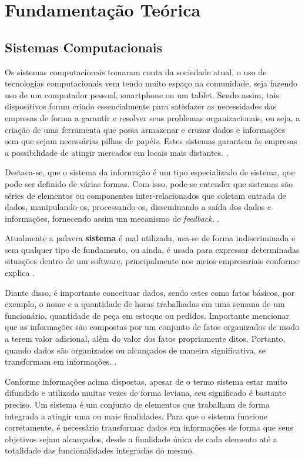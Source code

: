 \chapter{Fundamentação Teórica}

\section{Sistemas Computacionais}

Os sistemas computacionais tomaram conta da sociedade atual, o uso de tecnologias computacionais vem tendo muito espaço na comunidade, seja fazendo uso de um computador pessoal, smartphone ou um tablet. Sendo assim, tais dispositivos foram criado essencialmente para satisfazer as necessidades das empresas de forma a garantir e resolver seus problemas organizacionais, ou seja, a criação de uma ferramenta que possa armazenar e cruzar dados e informações sem que sejam necessárias pilhas de papéis. Estes sistemas garantem às empresas a possibilidade de atingir mercados em locais mais distantes. \cite{MATTIOLI2020}.

Destaca-se, que o sistema da informação é um tipo especializado de sistema, que pode ser definido de várias formas. Com isso, pode-se entender que sistemas são séries de elementos ou componentes inter-relacionados que coletam entrada de dados, manipulando-os, processando-os, disseminando a saída dos dados e informações, fornecendo assim um mecanismo de \textit{feedback}. \cite{STAIR2008}.

Atualmente a palavra \textbf{sistema} é mal utilizada, usa-se de forma indiscriminada e sem qualquer tipo de fundamento, ou ainda, é usada para expressar determinadas situações dentro de um software, principalmente nos meios empresariais conforme explica \cite{ROSSINI2006}.

Diante disso, é importante conceituar dados, sendo estes como fatos básicos, por exemplo, o nome e a quantidade de horas trabalhadas em uma semana de um funcionário, quantidade de peça em estoque ou pedidos. Importante mencionar que as informações são compostas por um conjunto de fatos organizados de modo a terem valor adicional, além do valor dos fatos propriamente ditos. Portanto, quando dados são organizados ou alcançados de maneira significativa, se transformam em informações. \cite{STAIR2008}.

Conforme informações acima dispostas, apesar de o termo sistema estar muito difundido e utilizado muitas vezes de forma leviana, seu significado é bastante preciso. Um sistema é um conjunto de elementos que trabalham de forma integrada a atingir uma ou mais finalidades.
Para que o sistema funcione corretamente, é necessário transformar dados em informações de forma que seus objetivos sejam alcançados, desde a finalidade única de cada elemento até a totalidade das funcionalidades integradas do mesmo.

